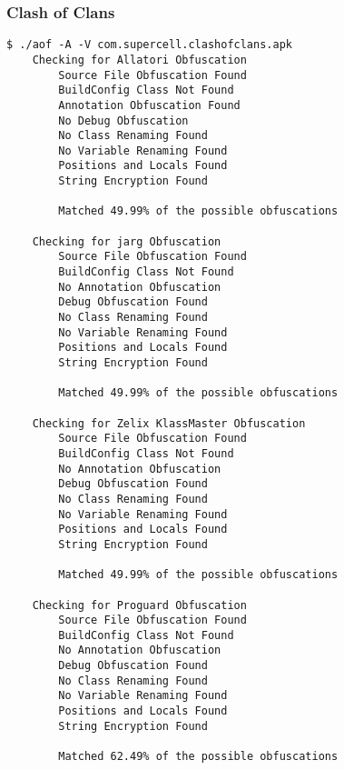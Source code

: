 \subsubsection{Clash of Clans \cite{clans}}
\label{app:cclans}
\begin{lstlisting}
$ ./aof -A -V com.supercell.clashofclans.apk
    Checking for Allatori Obfuscation
        Source File Obfuscation Found
        BuildConfig Class Not Found
        Annotation Obfuscation Found
        No Debug Obfuscation
        No Class Renaming Found
        No Variable Renaming Found
        Positions and Locals Found
        String Encryption Found

        Matched 49.99% of the possible obfuscations

    Checking for jarg Obfuscation
        Source File Obfuscation Found
        BuildConfig Class Not Found
        No Annotation Obfuscation
        Debug Obfuscation Found
        No Class Renaming Found
        No Variable Renaming Found
        Positions and Locals Found
        String Encryption Found

        Matched 49.99% of the possible obfuscations

    Checking for Zelix KlassMaster Obfuscation
        Source File Obfuscation Found
        BuildConfig Class Not Found
        No Annotation Obfuscation
        Debug Obfuscation Found
        No Class Renaming Found
        No Variable Renaming Found
        Positions and Locals Found
        String Encryption Found

        Matched 49.99% of the possible obfuscations

    Checking for Proguard Obfuscation
        Source File Obfuscation Found
        BuildConfig Class Not Found
        No Annotation Obfuscation
        Debug Obfuscation Found
        No Class Renaming Found
        No Variable Renaming Found
        Positions and Locals Found
        String Encryption Found

        Matched 62.49% of the possible obfuscations
\end{lstlisting}